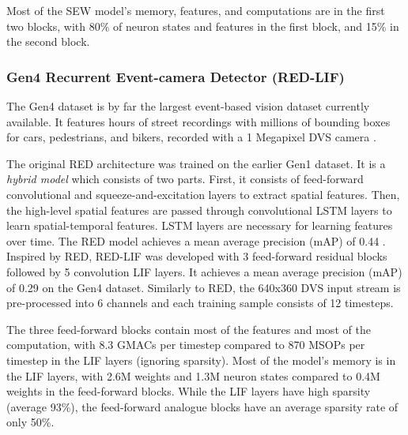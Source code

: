 Most of the SEW model's memory, features, and computations are in the first two blocks, with 80\% of neuron states and features in the first block, and 15\% in the second block. %

\subsubsection{Gen4 \textbf{R}ecurrent \textbf{E}vent-camera \textbf{D}etector (RED-LIF)} 

The Gen4 dataset is by far the largest event-based vision dataset currently available. It features hours of street recordings with millions of bounding boxes for cars, pedestrians, and bikers, recorded with a 1 Megapixel DVS camera \cite{red}. 

The original RED architecture was trained on the earlier Gen1 dataset. It is a \textit{hybrid model} which consists of two parts. First, it consists of feed-forward convolutional and squeeze-and-excitation layers to extract spatial features. Then, the high-level spatial features are passed through convolutional LSTM layers to learn spatial-temporal features.  LSTM layers are necessary for learning features over time. The RED model achieves a mean average precision (mAP) of 0.44 \cite{red}. Inspired by RED, RED-LIF  was developed with 3 feed-forward residual blocks followed by 5 convolution LIF layers. It achieves a mean average precision (mAP) of 0.29 on the Gen4 dataset\cite{yik2024neurobench}. Similarly to RED, the 640x360 DVS input stream is pre-processed into 6 channels and each training sample consists of 12 timesteps\cite{red}. 

The three feed-forward blocks contain most of the features and most of the computation, with 8.3 GMACs per timestep compared to 870 MSOPs per timestep in the LIF layers (ignoring sparsity). Most of the model's memory is in the LIF layers, with 2.6M weights and 1.3M neuron states compared to 0.4M weights in the feed-forward blocks. While the LIF layers have high sparsity (average 93\%), the feed-forward analogue blocks have an average sparsity rate of only 50\%. 




